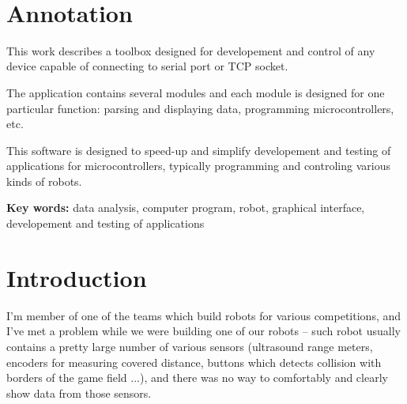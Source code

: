\documentclass[12pt, a4paper, oneside]{article}
\newcommand{\D}{\medskip \noindent} %
\newcommand{\B}{\textbf} %
\begin{document}
\newpage   %
~ %
\vspace{10mm}

\section*{Annotation}

This work describes a toolbox designed for developement and control of any device capable of connecting to serial port or TCP socket.

The application contains several modules and each module is designed for one particular function: parsing and displaying data, programming microcontrollers, etc.

This software is designed to speed-up and simplify developement and testing of applications for microcontrollers, typically programming and controling various kinds of robots.

\D \B{Key words:} data analysis, computer program, robot, graphical interface, developement and testing of applications

\addtolength{\textheight}{30mm} %

\newpage
\pagestyle{plain}

\setlength{\voffset}{-20mm} %
\setcounter{page}{1}  %

\tableofcontents  %

\addtolength{\textheight}{-30mm} %
\newpage
\setlength{\voffset}{0mm} %
\pagestyle{plain}
\section*{Introduction}
I'm member of one of the teams which build robots for various competitions, and I've met a problem while we were building one of our robots -- such robot usually contains a pretty large number of various sensors (ultrasound range meters, encoders for measuring covered distance, buttons which detects collision with borders of the game field ...), and there was no way to comfortably and clearly show data from those sensors.
\end{document}
